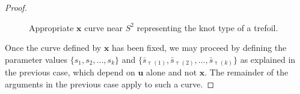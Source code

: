\documentclass[12pt]{article}
\numberwithin{equation}{subsection}
\theoremstyle{definition}
\numberwithin{lem}{section}
\begin{document}
\begin{proof}
\begin{figure}[h]
\begin{center}
\tikzset{font=\footnotesize}

\end{center}
\caption{Appropriate $\mathbf{x}$ curve near $S^2$ representing the knot type of a trefoil.}
\label{fig:partref}
\end{figure}

Once the curve defined by $\mathbf{x}$ has been fixed, we may proceed by defining the parameter values $\{s_1, s_2, \ldots, s_k\}$ and $\{\bar{s}_{\uptau(1)}, \bar{s}_{\uptau(2)}, \ldots, \bar{s}_{\uptau(k)}\}$ as explained in the previous case, which depend on $\mathbf{u}$ alone and not $\mathbf{x}$.  The remainder of the arguments in the previous case apply to such a curve.
\end{proof}

\newpage

{}

\end{document}
